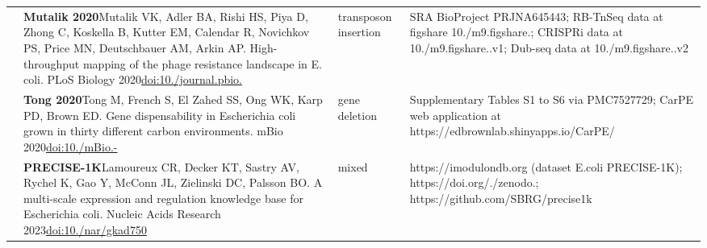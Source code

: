 \begin{landscape}
\begin{longtable}{@{}r@{\hspace{4pt}} L{86mm} L{74mm} L{78mm}@{}}
 & \textbf{Mutalik 2020}\newline Mutalik VK, Adler BA, Rishi HS, Piya D, Zhong C, Koskella B, Kutter EM, Calendar R, Novichkov PS, Price MN, Deutschbauer AM, Arkin AP. High-throughput mapping of the phage resistance landscape in E. coli. PLoS Biology 2020\newline \href{https://doi.org/10.1371/journal.pbio.3000877}{doi:10./\allowbreak journal.\allowbreak pbio.} & transposon insertion & SRA BioProject PRJNA645443; RB-\allowbreak TnSeq data at figshare 10./\allowbreak m9.\allowbreak figshare.; CRISPRi data at 10./\allowbreak m9.\allowbreak figshare..\allowbreak v1; Dub-\allowbreak seq data at 10./\allowbreak m9.\allowbreak figshare..\allowbreak v2 \\
 & \textbf{Tong 2020}\newline Tong M, French S, El Zahed SS, Ong WK, Karp PD, Brown ED. Gene dispensability in Escherichia coli grown in thirty different carbon environments. mBio 2020\newline \href{https://doi.org/10.1128/mBio.02259-20}{doi:10./\allowbreak mBio.-} & gene deletion & Supplementary Tables S1 to S6 via PMC7527729; CarPE web application at https:/\allowbreak /\allowbreak edbrownlab.\allowbreak shinyapps.\allowbreak io/\allowbreak CarPE/\allowbreak  \\
 & \textbf{PRECISE-1K}\newline Lamoureux CR, Decker KT, Sastry AV, Rychel K, Gao Y, McConn JL, Zielinski DC, Palsson BO. A multi-scale expression and regulation knowledge base for Escherichia coli. Nucleic Acids Research 2023\newline \href{https://doi.org/10.1093/nar/gkad750}{doi:10./\allowbreak nar/\allowbreak gkad750} & mixed & https:/\allowbreak /\allowbreak imodulondb.\allowbreak org (dataset E.\allowbreak  coli PRECISE-\allowbreak 1K); https:/\allowbreak /\allowbreak doi.\allowbreak org/./\allowbreak zenodo.; https:/\allowbreak /\allowbreak github.\allowbreak com/\allowbreak SBRG/\allowbreak precise1k \\

\end{longtable}
\end{landscape}

